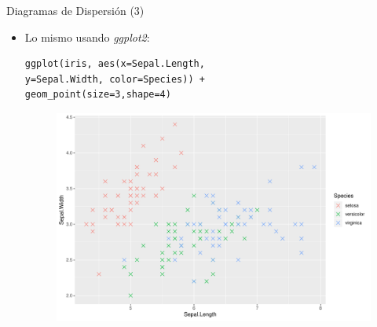 \documentclass[handout]{beamer}
\begin{document}
\begin{frame}[fragile]{Diagramas de Dispersión (3)}
\scriptsize{
\begin{itemize}
 \item Lo mismo usando \emph{ggplot2}:
 \begin{verbatim}
ggplot(iris, aes(x=Sepal.Length,
y=Sepal.Width, color=Species)) + 
geom_point(size=3,shape=4)
 \end{verbatim}

  \begin{figure}[h!]
	\centering
	\includegraphics[scale=0.4]{imagenes/scatterggplot2.pdf}		
\end{figure} 
 
 
\end{itemize}




}
\end{frame}
\end{document}
